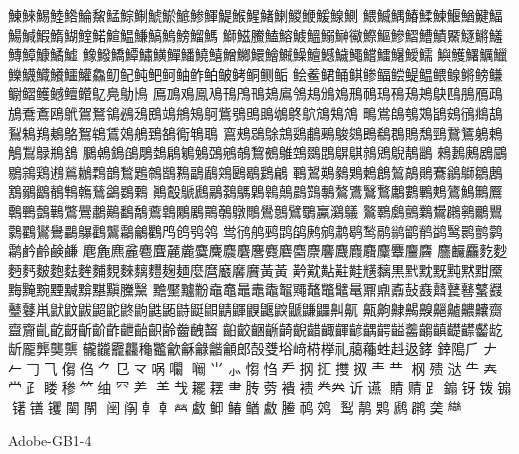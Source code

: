 鯟鯠鯣鯥鯦鯩鯬鯭鯮鯯鯱鯲鯳鯵鯶鯷鯸鯹鯺鯻鯼鯾鰀鰁鰂
鰃鰄鰅鰆鰇鰊鰋鰌鰎鰏鰑鰔鰕鰖鰗鰘鰙鰚鰛鰜鰝鰞鰟鰡鰢
鰤鰦鰧鰪鰫鰬鰮鰯鰰鰴鰶鰸鰺鰼鰽鰿鱀鱁鱂鱃鱄鱆鱇鱊鱋
鱌鱍鱎鱏鱐鱑鱓鱕鱙鱚鱛鱜鱞鱠鱡鱢鱣鱤鱥鱦鱨鱩鱪鱫鱬
鱮鱯鱰鱱鱲鱳鱴鱵鱶鱷鱹鱻鱽鱾鲀鲃鲄鲉鲊鲌鲏鲓鲖鲗鲘
鲙鲝鲪鲬鲯鲹鲾鲿鳀鳁鳂鳈鳉鳑鳒鳚鳛鳠鳡鳣鳤鳦鳧鳨鳪
鳫鳭鳮鳯鳰鳱鳲鳵鳷鳸鳹鳺鳻鳼鳽鳾鳿鴀鴁鴂鴃鴄鴅鴈鴊
鴋鴌鴍鴎鴏鴐鴑鴒鴓鴔鴖鴗鴘鴙鴚鴜鴞鴠鴡鴢鴤鴥鴧鴩鴪
鴫鴬鴭鴮鴱鴲鴳鴴鴵鴶鴷鴸鴹鴺鴼鴽鴾鵀鵁鵃鵄鵅鵆鵇鵈
鵉鵊鵋鵌鵍鵎鵏鵐鵔鵕鵖鵗鵘鵙鵚鵛鵞鵟鵢鵣鵤鵥鵦鵧鵨
鵩鵫鵭鵮鵰鵱鵳鵴鵵鵶鵷鵸鵹鵺鵻鵼鵽鵾鵿鶀鶁鶂鶃鶄鶅
鶆鶈鶊鶋鶌鶍鶎鶏鶐鶑鶒鶔鶕鶖鶗鶙鶛鶜鶝鶞鶟鶠鶡鶢鶣
鶤鶦鶧鶨鶪鶫鶬鶭鶮鶰鶱鶲鶳鶵鶶鶷鶸鶹鶺鶽鶾鶿鷁鷃鷅
鷆鷇鷈鷉鷊鷋鷌鷍鷎鷏鷐鷑鷒鷔鷕鷖鷘鷛鷜鷝鷞鷟鷠鷡鷢
鷣鷤鷧鷨鷩鷪鷫鷬鷭鷮鷰鷱鷴鷵鷶鷷鷻鷼鷽鷾鷿鸀鸁鸂鸃
鸄鸅鸆鸇鸈鸉鸊鸋鸍鸎鸏鸐鸑鸒鸓鸔鸖鸗鸘鸙鸜鸤鸧鸮鸰
鸴鸻鸼鹀鹍鹐鹒鹓鹔鹖鹙鹝鹟鹠鹡鹢鹥鹮鹯鹲鹴鹶鹷鹸鹻
麀麁麃麄麅麆麉麊麌麍麎麏麐麑麔麕麖麘麙麚麛麜麞麠麡
麢麣麤麧麨麪麫麬麭麮麰麱麲麳麶麷麹麺麼麿黀黁黂⿈黃
黅黆黇黈黊黋黐黒黓黕黖黗黙黚黡黣黤黦黫黬黭黮黰黱黳
黵黶黸黺鼀鼁鼂鼃鼄鼅鼆鼇鼈鼊鼌鼏鼑鼒鼔鼖鼘鼚鼛鼜鼝
鼞鼟鼡鼣鼤鼥鼦鼧鼨鼩鼪鼫鼭鼮鼰鼱鼲鼳鼴鼵鼶鼸鼺鼼鼿
齀齁齂齃齅齆齇齈齉齌齍齎齓齕齖齗齘齚齛齝齞齢齤齥齧
齨齩齫齭齮齯齰齱齳齴齵齶齸齹齺齻齼齽齾龁龂龎龏龑龒
龓龖龗龘龝龞龡龢龣龤龥郎嗀﨎﨏﨑﨓﨔礼﨟蘒﨡﨣﨤﨧
﨨﨩⺁𠂇𠂉𠃌⺄㑳㑇⺈⺋龴㖞㘚
㘎⺌⺗㥮㤘龵㧏㧟㩳㧐龶龷
㭎㱮㳠⺧𡗗龸⺪䁖䅟⺮䌷⺳⺶
⺷𢦏䎱䎬⺻䏝䓖䙡䙌龹𠔉䜣䜩
䝼䞍⻊䥇䥺䥽䦂䦃䦅䦆䦟䦛
䦷䦶龺𠦝𤇾䲣䲟䲠䲡䱷䲢䴓䴔
䴕䴖䴗䴘䴙䶮龻

Adobe-GB1-4

